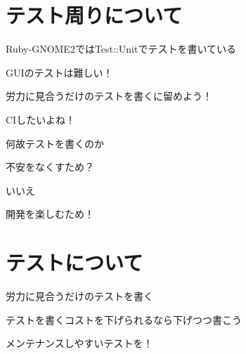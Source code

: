 \section{テスト周りについて}
\begin{frame}
\begin{itemize}
{\huge
\item{} Ruby-GNOME2ではTest::Unitでテストを書いている
\item{} GUIのテストは難しい！
\item{} 労力に見合うだけのテストを書くに留めよう！
\item{} CIしたいよね！
}
\end{itemize}
\end{frame}

\begin{frame}
\begin{center}
{\Huge
\item 何故テストを書くのか
}
\end{center}
\end{frame}

\begin{frame}
\begin{center}
{\Huge
\item 不安をなくすため？
}
\end{center}
\end{frame}

\begin{frame}
\begin{center}
{\Huge
\item いいえ
}
\end{center}
\end{frame}

\begin{frame}
\begin{center}
{\Huge
開発を楽しむため！
}
\end{center}
\end{frame}

\section{テストについて}

\begin{frame}
\begin{itemize}
{\huge
\item{} 労力に見合うだけのテストを書く
\item{} テストを書くコストを下げられるなら下げつつ書こう
\item{} メンテナンスしやすいテストを！
}
\end{itemize}
\end{frame}
